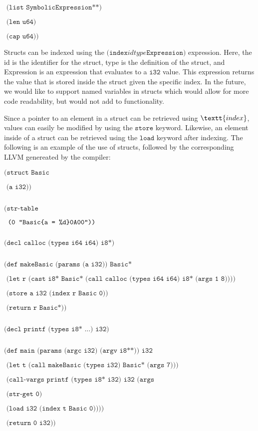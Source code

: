 \documentclass[journal=jacsat, manuscript=article]{achemso}
\begin{document}
$\texttt{  (list SymbolicExpression**)}$

$\texttt{  (len u64)}$

$\texttt{  (cap u64))}$

Structs can be indexed using the $\texttt{(index} id type \texttt{Expression)}$ expression. Here, the
id is the identifier for the struct, type is the definition of the struct, and Expression is an expression
that evaluates to a $\texttt{i32}$ value. This expression returns the value that is stored inside the
struct given the specific index. In the future, we would like to support named variables in structs which
would allow for more code readability, but would not add to functionality.

Since a pointer to an element in a struct can be retrieved using $\textt{index}$, values can easily be
modified by using the $\texttt{store}$ keyword. Likewise, an element inside of a struct can be retrieved
using the $\texttt{load}$ keyword after indexing. The following is an example of the use of structs, followed
by the corresponding LLVM genereated by the compiler:

\footnotesize{ 
$\texttt{(struct Basic}$

$\texttt{  (a i32))}$

$\texttt{}$

$\texttt{(str-table}$

$\texttt{  (0 "Basic\{a = \%d\}\\0A\\00"))}$

$\texttt{}$

$\texttt{(decl calloc (types i64 i64) i8*)}$

$\texttt{}$

$\texttt{(def makeBasic (params (a i32)) Basic*}$

$\texttt{  (let r (cast i8* Basic* (call calloc (types i64 i64) i8* (args 1 8))))}$

$\texttt{  (store a i32 (index r Basic 0))}$

$\texttt{  (return r Basic*))}$

$\texttt{}$

$\texttt{(decl printf (types i8* ...) i32)}$

$\texttt{}$

$\texttt{(def main (params (argc i32) (argv i8**)) i32}$

$\texttt{  (let t (call makeBasic (types i32) Basic* (args 7)))}$

$\texttt{  (call-vargs printf (types i8* i32) i32 (args}$

$\texttt{    (str-get 0)}$

$\texttt{    (load i32 (index t Basic 0))))}$

$\texttt{  (return 0 i32))}$
}
\end{document}
